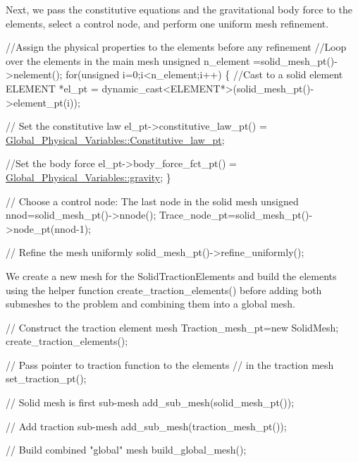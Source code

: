 Next, we pass the constitutive equations and the gravitational body force to the elements, select a control node, and perform one uniform mesh refinement.


\begin{DoxyCodeInclude}

 \textcolor{comment}{//Assign the physical properties to the elements before any refinement}
 \textcolor{comment}{//Loop over the elements in the main mesh}
 \textcolor{keywordtype}{unsigned} n\_element =solid\_mesh\_pt()->nelement();
 \textcolor{keywordflow}{for}(\textcolor{keywordtype}{unsigned} i=0;i<n\_element;i++)
  \{
   \textcolor{comment}{//Cast to a solid element}
   ELEMENT *el\_pt = \textcolor{keyword}{dynamic\_cast<}ELEMENT*\textcolor{keyword}{>}(solid\_mesh\_pt()->element\_pt(i));
   
   \textcolor{comment}{// Set the constitutive law}
   el\_pt->constitutive\_law\_pt() =
    \hyperlink{namespaceGlobal__Physical__Variables_a5d5f19442938130d36ee7476ae25049c}{Global\_Physical\_Variables::Constitutive\_law\_pt};

   \textcolor{comment}{//Set the body force}
   el\_pt->body\_force\_fct\_pt() = \hyperlink{namespaceGlobal__Physical__Variables_a0777aef63372db7f91ad894c38159681}{Global\_Physical\_Variables::gravity};
  \}


 \textcolor{comment}{// Choose a control node: The last node in the solid mesh}
 \textcolor{keywordtype}{unsigned} nnod=solid\_mesh\_pt()->nnode();
 Trace\_node\_pt=solid\_mesh\_pt()->node\_pt(nnod-1);

 \textcolor{comment}{// Refine the mesh uniformly}
 solid\_mesh\_pt()->refine\_uniformly();

\end{DoxyCodeInclude}


We create a new mesh for the {\ttfamily Solid\+Traction\+Elements} and build the elements using the helper function {\ttfamily create\+\_\+traction\+\_\+elements()} before adding both submeshes to the problem and combining them into a global mesh.


\begin{DoxyCodeInclude}

 \textcolor{comment}{// Construct the traction element mesh}
 Traction\_mesh\_pt=\textcolor{keyword}{new} SolidMesh;
 create\_traction\_elements();
 
 \textcolor{comment}{// Pass pointer to traction function to the elements}
 \textcolor{comment}{// in the traction mesh}
 set\_traction\_pt();
 
 \textcolor{comment}{// Solid mesh is first sub-mesh}
 add\_sub\_mesh(solid\_mesh\_pt());

 \textcolor{comment}{// Add traction sub-mesh}
 add\_sub\_mesh(traction\_mesh\_pt());

 \textcolor{comment}{// Build combined "global" mesh}
 build\_global\_mesh();

\end{DoxyCodeInclude}


